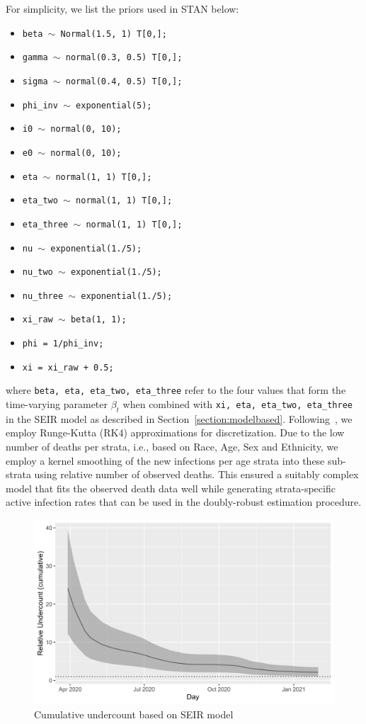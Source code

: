 \documentclass[11pt]{amsart}
\numberwithin{equation}{section}
\theoremstyle{plain}
\def\code#1{\texttt{#1}}
\begin{document}
For simplicity, we list the priors used in STAN below:
\begin{itemize}
  \item \code{beta $\sim$ Normal(1.5, 1) T[0,];}
  \item \code{gamma $\sim$ normal(0.3, 0.5) T[0,];}
  \item \code{sigma $\sim$ normal(0.4, 0.5) T[0,];}
  \item \code{phi\_inv $\sim$ exponential(5);}
  \item \code{i0 $\sim$ normal(0, 10);}
  \item \code{e0 $\sim$ normal(0, 10);}
  \item \code{eta $\sim$ normal(1, 1) T[0,];}
  \item \code{eta\_two $\sim$ normal(1, 1) T[0,];}
  \item \code{eta\_three $\sim$ normal(1, 1) T[0,];}
  \item \code{nu $\sim$ exponential(1./5);}
  \item \code{nu\_two $\sim$ exponential(1./5);}
  \item \code{nu\_three $\sim$ exponential(1./5);}
  \item \code{xi\_raw $\sim$ beta(1, 1);}
  \item \code{phi = 1/phi\_inv;}
  \item \code{xi = xi\_raw + 0.5;}
\end{itemize}
where \code{beta, eta, eta\_two, eta\_three} refer to the four values that form the time-varying parameter $\beta_t$ when combined with \code{xi, eta, eta\_two, eta\_three} in the SEIR model as described in Section~\ref{section:modelbased}. Following~\cite{Song2020}, we employ Runge-Kutta (RK4) approximations for discretization.  Due to the low number of deaths per strata, i.e., based on Race, Age, Sex and Ethnicity, we employ a kernel smoothing of the new infections per age strata into these sub-strata using relative number of observed deaths.  This ensured a suitably complex model that fits the observed death data well while generating strata-specific active infection rates that can be used in the doubly-robust estimation procedure.

\begin{figure}[!th]
 \centering
 \includegraphics[width=.6\linewidth]{../figs/cumulative_undercounting.png}
 \caption{Cumulative undercount based on SEIR model}
 \label{fig:undercounting}
\end{figure}
\end{document}

